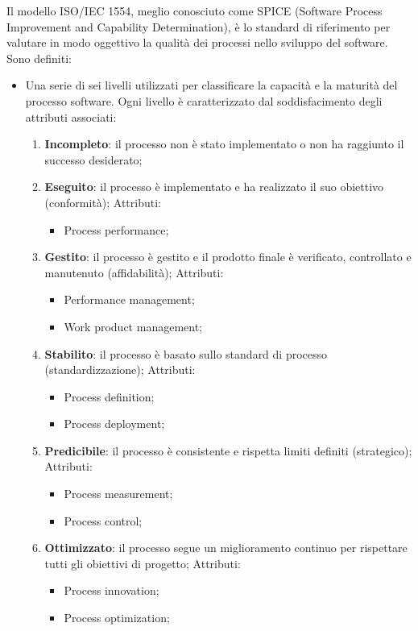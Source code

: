 Il modello ISO/IEC 1554, meglio conosciuto come SPICE (Software Process Improvement and Capability Determination), è lo standard di riferimento per valutare in modo oggettivo la qualità dei processi nello sviluppo del software. \newline
Sono definiti:
\begin{itemize}
	\item Una serie di sei livelli utilizzati per classificare la capacità e la maturità del processo software. Ogni livello è caratterizzato dal soddisfacimento degli attributi associati:
	\begin{enumerate} 
	\item \textbf{Incompleto}: il processo non è stato implementato o non ha raggiunto il successo desiderato;
	\item \textbf{Eseguito}: il processo è implementato e ha realizzato il suo obiettivo (conformità);
		Attributi:
		\begin{itemize}
	    	\item Process performance;
    		\end{itemize}
	\item \textbf{Gestito}: il processo è gestito e il prodotto finale è verificato, controllato e manutenuto (affidabilità);
		Attributi:
		\begin{itemize}	
	    	\item Performance management;
	    	\item Work product management;
		\end{itemize}
    	\item \textbf{Stabilito}: il processo è basato sullo standard di processo (standardizzazione);
		Attributi:
		\begin{itemize}
		\item Process definition;
		\item Process deployment;
		\end{itemize}
    	\item \textbf{Predicibile}: il processo è consistente e rispetta limiti definiti (strategico);
		Attributi:
		\begin{itemize}
		\item Process measurement;
		\item Process control;
		\end{itemize}
    	\item \textbf{Ottimizzato}: il processo segue un  miglioramento continuo per rispettare tutti gli obiettivi di progetto;
		Attributi:
		\begin{itemize}
		\item Process innovation;
		\item Process optimization;
		\end{itemize}
    	\end{enumerate}
	

\end{itemize}
